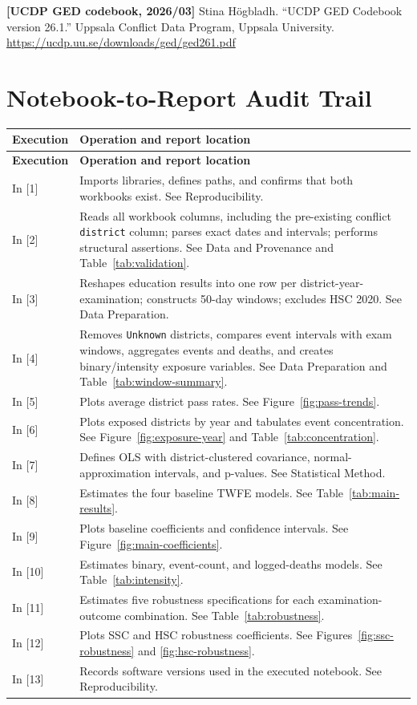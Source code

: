 \documentclass[11pt]{article}
\begin{document}
\textbf{[UCDP GED codebook, 2026/03]} Stina H\"ogbladh. ``UCDP GED Codebook version 26.1.'' Uppsala Conflict Data Program, Uppsala University. \url{https://ucdp.uu.se/downloads/ged/ged261.pdf}

\appendix
\clearpage
\section{Notebook-to-Report Audit Trail}

\begin{longtable}{p{}p{}}
\toprule
\textbf{Execution} & \textbf{Operation and report location} \\
\midrule
\endfirsthead
\toprule
\textbf{Execution} & \textbf{Operation and report location} \\
\midrule
\endhead
In [1] & Imports libraries, defines paths, and confirms that both workbooks exist. See Reproducibility. \\
In [2] & Reads all workbook columns, including the pre-existing conflict \texttt{district} column; parses exact dates and intervals; performs structural assertions. See Data and Provenance and Table~\ref{tab:validation}. \\
In [3] & Reshapes education results into one row per district-year-examination; constructs 50-day windows; excludes HSC 2020. See Data Preparation. \\
In [4] & Removes \texttt{Unknown} districts, compares event intervals with exam windows, aggregates events and deaths, and creates binary/intensity exposure variables. See Data Preparation and Table~\ref{tab:window-summary}. \\
In [5] & Plots average district pass rates. See Figure~\ref{fig:pass-trends}. \\
In [6] & Plots exposed districts by year and tabulates event concentration. See Figure~\ref{fig:exposure-year} and Table~\ref{tab:concentration}. \\
In [7] & Defines OLS with district-clustered covariance, normal-approximation intervals, and p-values. See Statistical Method. \\
In [8] & Estimates the four baseline TWFE models. See Table~\ref{tab:main-results}. \\
In [9] & Plots baseline coefficients and confidence intervals. See Figure~\ref{fig:main-coefficients}. \\
In [10] & Estimates binary, event-count, and logged-deaths models. See Table~\ref{tab:intensity}. \\
In [11] & Estimates five robustness specifications for each examination-outcome combination. See Table~\ref{tab:robustness}. \\
In [12] & Plots SSC and HSC robustness coefficients. See Figures~\ref{fig:ssc-robustness} and \ref{fig:hsc-robustness}. \\
In [13] & Records software versions used in the executed notebook. See Reproducibility. \\
\bottomrule
\end{longtable}
\end{document}

